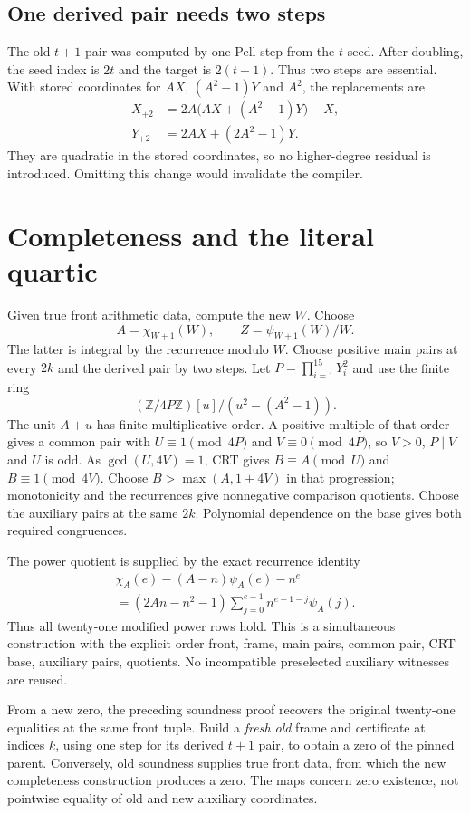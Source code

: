 \documentclass[11pt]{article}
\newcommand{\Z}{\mathbb Z}\newcommand{\N}{\mathbb N}
\theoremstyle{definition}\newtheorem{definition}[theorem]{Definition}
\theoremstyle{remark}\newtheorem{remark}[theorem]{Remark}
\begin{document}
\subsection{One derived pair needs two steps}
The old $t+1$ pair was computed by one Pell step from the $t$ seed.
After doubling, the seed index is $2t$ and the target is $2(t+1)$.
Thus two steps are essential. With stored coordinates for $AX$,
$(A^2-1)Y$ and $A^2$, the replacements are
\begin{align}
 X_{+2}&=2A\bigl(AX+(A^2-1)Y\bigr)-X,\\
 Y_{+2}&=2AX+(2A^2-1)Y.
\end{align}
They are quadratic in the stored coordinates, so no higher-degree
residual is introduced. Omitting this change would invalidate the compiler.

\section{Completeness and the literal quartic}

Given true front arithmetic data, compute the new $W$. Choose
\[
 A=\chi_{W+1}(W),\qquad Z=\psi_{W+1}(W)/W.
\]
The latter is integral by the recurrence modulo $W$. Choose positive main
pairs at every $2k$ and the derived pair by two steps. Let
$P=\prod_{i=1}^{15}Y_i^2$ and use the finite ring
\[
 (\Z/4P\Z)[u]/(u^2-(A^2-1)).
\]
The unit $A+u$ has finite multiplicative order. A positive multiple of
that order gives a common pair with $U\equiv1\pmod{4P}$ and
$V\equiv0\pmod{4P}$, so $V>0$, $P\mid V$ and $U$ is odd.
As $\gcd(U,4V)=1$, CRT gives $B\equiv A\pmod U$ and
$B\equiv1\pmod{4V}$. Choose $B>\max(A,1+4V)$ in that progression; monotonicity and the
recurrences give nonnegative comparison quotients. Choose the auxiliary
pairs at the same $2k$.
Polynomial dependence on the base gives both required congruences.

The power quotient is supplied by the exact recurrence identity
\begin{multline}
 \chi_A(e)-(A-n)\psi_A(e)-n^e\\
 =(2An-n^2-1)\sum_{j=0}^{e-1}n^{e-1-j}\psi_A(j).
\end{multline}
Thus all twenty-one modified power rows hold. This is a simultaneous
construction with the explicit order front, frame, main pairs, common
pair, CRT base, auxiliary pairs, quotients. No incompatible preselected
auxiliary witnesses are reused.

From a new zero, the preceding soundness proof recovers the original
twenty-one equalities at the same front tuple. Build a \emph{fresh old}
frame and certificate at indices $k$, using one step for its derived
$t+1$ pair, to obtain a zero of the pinned parent. Conversely, old
soundness supplies true front data, from which the new completeness
construction produces a zero. The maps concern zero existence, not
pointwise equality of old and new auxiliary coordinates.
\end{document}
